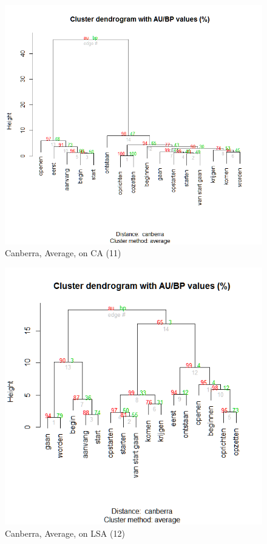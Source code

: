\begin{figure}
\includegraphics[height=.3\textheight]{figures/Vandevoorde2-img40.png}
\caption{\label{fig:key:40}  Canberra, Average, on CA (11)}
\end{figure}

\begin{figure}
\includegraphics[height=.3\textheight]{figures/Vandevoorde2-img41.png}
\caption{\label{fig:key:41}  Canberra, Average, on LSA (12)}
\end{figure}

